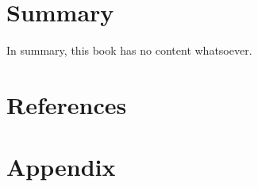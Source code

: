\documentclass[
  11pt,
  letterpaper,
]{book}
\newlength{\cslhangindent}
\newlength{\cslentryspacingunit} %
\newenvironment{CSLReferences}[2] %
 {%
  \setlength{\parindent}{0pt}
  \ifodd #1
  \let\oldpar\par
  \def\par{\hangindent=\cslhangindent\oldpar}
  \fi
  \setlength{\parskip}{#2\cslentryspacingunit}
 }%
 {}
\begin{document}
\hypertarget{summary}{%
\chapter{Summary}\label{summary}}

In summary, this book has no content whatsoever.


\hypertarget{references}{%
\chapter*{References}\label{references}}


\hypertarget{refs}{}
\begin{CSLReferences}{0}{0}
\end{CSLReferences}

\cleardoublepage
{}
{}
\appendix

\hypertarget{appendix}{%
\chapter{Appendix}\label{appendix}}


\backmatter
\end{document}
